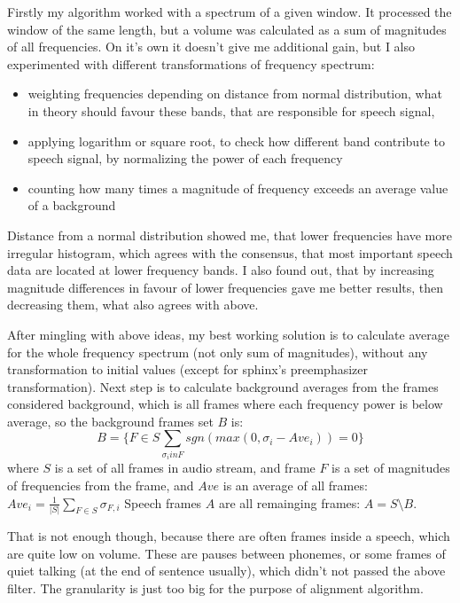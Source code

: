 \documentclass[12pt,a4paper,english]{article}
\begin{document}
Firstly my algorithm worked with a spectrum of a given window. It processed the window of the same length, but a volume was calculated as a sum of magnitudes of all frequencies. On it's own it doesn't give me additional gain, but I also experimented with different transformations of frequency spectrum:
\begin{itemize}
    \item weighting frequencies depending on distance from normal distribution, what in theory should favour these bands, that are responsible for speech signal,
    \item applying logarithm or square root, to check how different band contribute to speech signal, by normalizing the power of each frequency
    \item counting how many times a magnitude of frequency exceeds an average value of a background
\end{itemize}


\newpage

Distance from a normal distribution showed me, that lower frequencies have more irregular histogram, which agrees with the consensus, that most important speech data are located at lower frequency bands. \newline 
I also found out, that by increasing magnitude differences in favour of lower frequencies gave me better results, then decreasing them, what also agrees with above. \newline

After mingling with above ideas, my best working solution is to calculate average for the whole frequency spectrum (not only sum of magnitudes), without any transformation to initial values (except for sphinx's preemphasizer transformation).
Next step is to calculate background averages from the frames considered background, which is all frames where each frequency power is below average, so the background frames set $B$ is:
\begin{equation}
    B = \{ F \in S \sum_{\sigma_i in F} sgn(max(0, \sigma_i - Ave_i)) = 0 \}
\end{equation}
where $S$ is a set of all frames in audio stream, and frame $F$ is a set of magnitudes of frequencies from the frame,
and $Ave$ is an average of all frames: $Ave_i = \frac 1 {|S|} \sum_{F \in S} \sigma_{F, i}$
Speech frames $A$ are all remainging frames: $A = S \setminus B$. \newline

That is not enough though, because there are often frames inside a speech, which are quite low on volume. These are pauses between phonemes, or some frames of quiet talking (at the end of sentence usually), which didn't not passed the above filter. The granularity is just too big for the purpose of alignment algorithm. \newline
\end{document}
